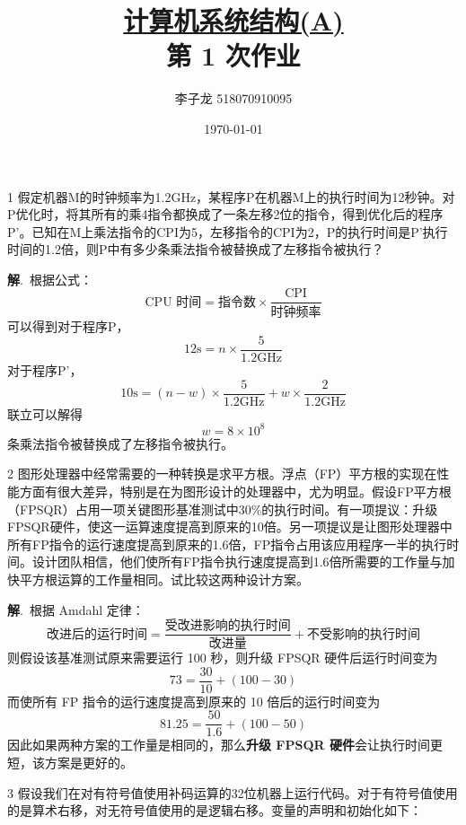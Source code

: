 \documentclass[12pt,a4paper]{article}
\newenvironment{problems}{\begin{list}{}{\renewcommand{\makelabel}[1]{\textbf{##1}.\hfil}}}{\end{list}}
\providecommand{\sol}{\textbf{解}.~}
\begin{document}
\title{\normalsize \underline{计算机系统结构(A)}\\\LARGE 第 1 次作业}
\author{李子龙 518070910095}
\date{\today}
\maketitle

\begin{problems}
    \item[1] 假定机器M的时钟频率为1.2GHz，某程序P在机器M上的执行时间为12秒钟。对P优化时，将其所有的乘4指令都换成了一条左移2位的指令，得到优化后的程序P'。已知在M上乘法指令的CPI为5，左移指令的CPI为2，P的执行时间是P'执行时间的1.2倍，则P中有多少条乘法指令被替换成了左移指令被执行？
     
    \sol 根据公式：
    \begin{equation*}
        \text{CPU 时间} = \text{指令数}\times\frac{\text{CPI}}{\text{时钟频率}}
    \end{equation*}
    可以得到对于程序P，
    \begin{equation*}
        12\text{s} = n \times \frac{5}{\text{1.2GHz}}
    \end{equation*}
    对于程序P'，
    \begin{equation*}
        10\text{s} = (n - w) \times \frac{5}{\text{1.2GHz}} + w\times \frac{2}{\text{1.2GHz}}
    \end{equation*}
    联立可以解得
    \begin{equation*}
        w = 8\times 10^8
    \end{equation*}
    条乘法指令被替换成了左移指令被执行。
    \item[2] 图形处理器中经常需要的一种转换是求平方根。浮点（FP）平方根的实现在性能方面有很大差异，特别是在为图形设计的处理器中，尤为明显。假设FP平方根（FPSQR）占用一项关键图形基准测试中30\%的执行时间。有一项提议：升级FPSQR硬件，使这一运算速度提高到原来的10倍。另一项提议是让图形处理器中所有FP指令的运行速度提高到原来的1.6倍，FP指令占用该应用程序一半的执行时间。设计团队相信，他们使所有FP指令执行速度提高到1.6倍所需要的工作量与加快平方根运算的工作量相同。试比较这两种设计方案。
    
    \sol 根据 Amdahl 定律：
    \begin{equation*}
        \text{改进后的运行时间} = \frac{\text{受改进影响的执行时间}}{\text{改进量}} + \text{不受影响的执行时间} 
    \end{equation*}
    则假设该基准测试原来需要运行 100 秒，则升级 FPSQR 硬件后运行时间变为
    \begin{equation*}
        73 = \frac{30}{10} + (100 - 30)
    \end{equation*}
    而使所有 FP 指令的运行速度提高到原来的 10 倍后的运行时间变为
    \begin{equation*}
        81.25 = \frac{50}{1.6} + (100 - 50)
    \end{equation*}
    因此如果两种方案的工作量是相同的，那么\textbf{升级 FPSQR 硬件}会让执行时间更短，该方案是更好的。
    \item[3] 假设我们在对有符号值使用补码运算的32位机器上运行代码。对于有符号值使用的是算术右移，对无符号值使用的是逻辑右移。变量的声明和初始化如下：
     

\end{problems}
\end{document}
